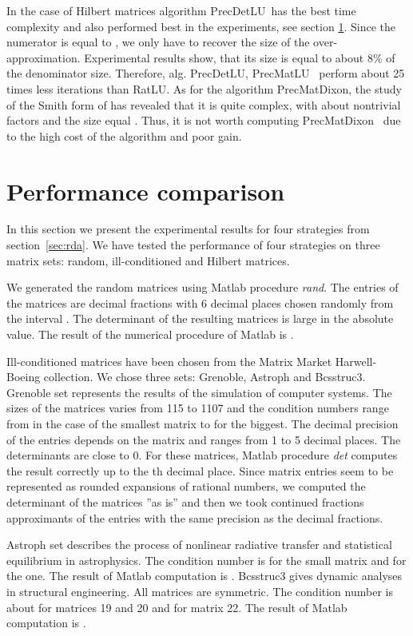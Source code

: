 \documentclass{acm_proc_article-sp}   \usepackage{graphicx,url}
\newcommand{\algrdRat}{RatLU}
\newcommand{\algrdDet}{PrecDetLU}
\newcommand{\algrdMat}{PrecMatLU}
\newcommand{\algrdDixon}{PrecMatDixon}
\begin{document}
In the case of Hilbert matrices algorithm \algrdDet~\-has the best time complexity and also performed best in the experiments, see section \ref{sec:exp}. Since the numerator is equal to , we only have to recover the size of the over-approximation. Experimental results show, that its size is equal to about 8\% of the denominator size. Therefore, alg. \algrdDet, \algrdMat~ perform about 25 times less iterations than \algrdRat. As for the algorithm \algrdDixon, the study of the Smith form of  has revealed that it is quite complex, with about  nontrivial factors and the size  equal . Thus, it is not worth computing \algrdDixon~ due to the high cost of the algorithm and poor gain.



\section{Performance comparison}\label{sec:exp}

In this section we present the experimental results for four strategies
from section~\ref{sec:rda}. We have tested the performance of four strategies on three
matrix sets: random, ill-conditioned and Hilbert matrices. 


We generated the random matrices using Matlab procedure {\em rand}. The entries of the matrices are decimal fractions with 6 decimal places chosen randomly from the interval . The determinant  of the resulting matrices is large in the absolute value. The result of the numerical procedure of  Matlab is .

Ill-conditioned matrices have been chosen from the Matrix Market \cite{matrixMarket} Harwell-Boeing collection. We chose three sets: Grenoble, Astroph and Bcsstruc3.
Grenoble set represents the results of the simulation of computer systems.
The sizes of the matrices varies from 115 to 1107 and the condition numbers range from  in the case of the smallest matrix to  for the biggest.
The decimal precision of the entries depends on the matrix and ranges from 1 to 5 decimal places.
The determinants are close to 0.
For these matrices, Matlab procedure {\em det} computes the result correctly up to the th decimal place.
Since matrix entries seem to be represented as rounded expansions of rational numbers, we computed the determinant of the matrices ''as is'' and then we took continued fractions approximants of the entries with the same precision as the decimal fractions.

Astroph set describes the process of nonlinear radiative transfer and statistical equilibrium in astrophysics.
The condition number is  for the small  matrix and  for the  one.
The result of Matlab computation is .
Bcsstruc3 gives dynamic analyses in structural engineering.
All matrices are symmetric.
The condition number is about  for matrices 19 and 20 and  for matrix 22.
The result of Matlab computation is .
\end{document}
